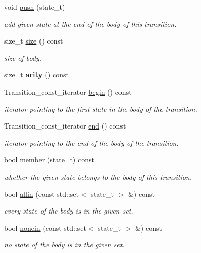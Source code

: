\begin{DoxyCompactItemize}
void \mbox{\hyperlink{group__schemata_gaacc3c061a48c15ce02b2ead05f9bb2bf}{push}} (state\+\_\+t)
\begin{DoxyCompactList}\small\item\em add given state at the end of the body of this transition. \end{DoxyCompactList}\item 
size\+\_\+t \mbox{\hyperlink{group__schemata_ga743ca128dc509e129a49d66500a0f151}{size}} () const
\begin{DoxyCompactList}\small\item\em size of body. \end{DoxyCompactList}\item 
size\+\_\+t {\bfseries arity} () const
\item 
\mbox{\label{classTransition_a9bfff4ceb09c77df98c708c005bda5cb}} 
Transition\+\_\+const\+\_\+iterator \mbox{\hyperlink{classTransition_a9bfff4ceb09c77df98c708c005bda5cb}{begin}} () const
\begin{DoxyCompactList}\small\item\em iterator pointing to the first state in the body of the transition. \end{DoxyCompactList}\item 
\mbox{\label{classTransition_a985c1d4cc1444ebb75e7703be48eb564}} 
Transition\+\_\+const\+\_\+iterator \mbox{\hyperlink{classTransition_a985c1d4cc1444ebb75e7703be48eb564}{end}} () const
\begin{DoxyCompactList}\small\item\em iterator pointing to the end of the body of the transition. \end{DoxyCompactList}\item 
bool \mbox{\hyperlink{group__schemata_gab94ff39ee66515e72c1c52ba855508c8}{member}} (state\+\_\+t) const
\begin{DoxyCompactList}\small\item\em whether the given state belongs to the body of this transition. \end{DoxyCompactList}\item 
bool \mbox{\hyperlink{group__schemata_ga9719bf4a7c1e1ec8e0e1fceed8da0a11}{allin}} (const std\+::set$<$ state\+\_\+t $>$ \&) const
\begin{DoxyCompactList}\small\item\em every state of the body is in the given set. \end{DoxyCompactList}\item 
bool \mbox{\hyperlink{group__schemata_ga6bb49bac8dc5d5dbfb955b9eaea29276}{nonein}} (const std\+::set$<$ state\+\_\+t $>$ \&) const
\begin{DoxyCompactList}\small\item\em no state of the body is in the given set. \end{DoxyCompactList}\end{DoxyCompactItemize}
